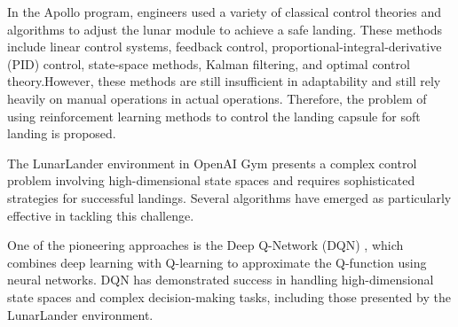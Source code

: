 \documentclass[conference]{IEEEtran}
\begin{document}

In the Apollo program, engineers used a variety of classical control theories and algorithms to adjust the lunar module to achieve a safe landing. These methods include linear control systems\cite{ogata2010modern}, feedback control\cite{franklin2015feedback}, proportional-integral-derivative (PID) control\cite{astrom2010feedback}, state-space methods\cite{kailath1980linear}, Kalman filtering\cite{kalman1960new}, and optimal control theory\cite{kirk2004optimal}.However, these methods are still insufficient in adaptability and still rely heavily on manual operations in actual operations. Therefore, the problem of using reinforcement learning methods to control the landing capsule for soft landing is proposed\cite{brockman2016openai}.

The LunarLander environment in OpenAI Gym presents a complex control problem involving high-dimensional state spaces and requires sophisticated strategies for successful landings. Several algorithms have emerged as particularly effective in tackling this challenge. 

One of the pioneering approaches is the Deep Q-Network (DQN) \cite{mnih2015human}, which combines deep learning with Q-learning to approximate the Q-function using neural networks. DQN has demonstrated success in handling high-dimensional state spaces and complex decision-making tasks, including those presented by the LunarLander environment. 
\end{document}
